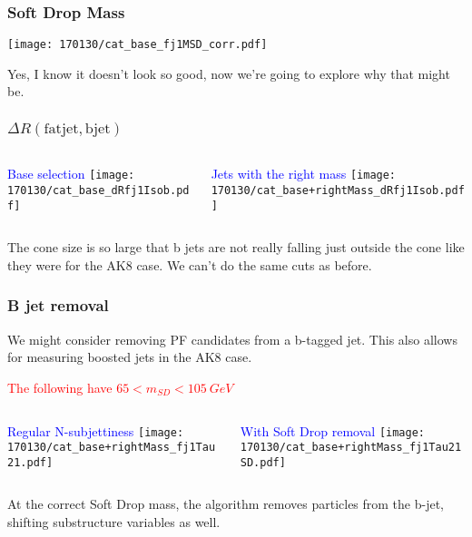 \documentclass{beamer}
\begin{document}
\begin{frame}
  \frametitle{Soft Drop Mass}

  \begin{center}
  \texttt{[image: 170130/cat\_base\_fj1MSD\_corr.pdf]}
  \end{center}

  Yes, I know it doesn't look so good, now we're going to explore why that might be.

\end{frame}

\begin{frame}
  \frametitle{$\Delta R\mathrm{(fat jet, b jet)}$}

  \begin{columns}
    \begin{column}{0.5\linewidth}
      \centering
      \textcolor{blue}{Base selection}
      \texttt{[image: 170130/cat\_base\_dRfj1Isob.pdf]}
    \end{column}
    \begin{column}{0.5\linewidth}
      \centering
      \textcolor{blue}{Jets with the right mass}
      \texttt{[image: 170130/cat\_base+rightMass\_dRfj1Isob.pdf]}
    \end{column}
  \end{columns}

  The cone size is so large that b jets are not really falling just outside the cone
  like they were for the AK8 case.
  We can't do the same cuts as before.

\end{frame}

\begin{frame}
  \frametitle{B jet removal}

  We might consider removing PF candidates from a b-tagged jet.
  This also allows for measuring boosted jets in the AK8 case.

  \textcolor{red}{The following have $65 < m_{SD} < \SI{105}{GeV}$}

  \begin{columns}
    \begin{column}{0.5\linewidth}
      \centering
      \textcolor{blue}{Regular N-subjettiness}
      \texttt{[image: 170130/cat\_base+rightMass\_fj1Tau21.pdf]}
    \end{column}
    \begin{column}{0.5\linewidth}
      \centering
      \textcolor{blue}{With Soft Drop removal}
      \texttt{[image: 170130/cat\_base+rightMass\_fj1Tau21SD.pdf]}
    \end{column}
  \end{columns}

  At the correct Soft Drop mass, the algorithm removes particles from the b-jet, shifting substructure variables as well.

\end{frame}
\end{document}
